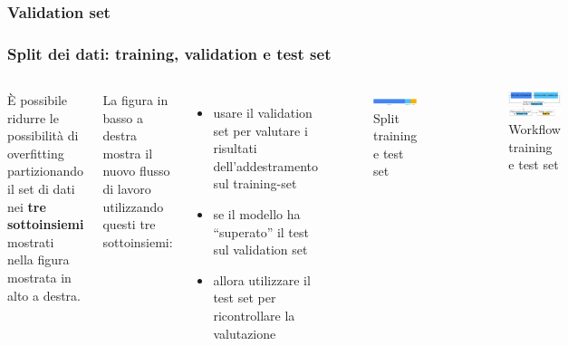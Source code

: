 \subsubsection[Validation set]{Validation set}


\begin{frame}

	\frametitle{Split dei dati: training, validation e test set}
	\begin{columns}
		È possibile ridurre le possibilità di overfitting partizionando il set di dati nei \textbf{tre sottoinsiemi} mostrati nella figura mostrata in alto a destra.
		\newlinedouble

		La figura in basso a destra mostra il nuovo flusso di lavoro utilizzando questi tre sottoinsiemi:
		\begin{itemize}
			\item usare il validation set per valutare i risultati dell'addestramento sul training-set
			\item se il modello ha ``superato'' il test sul validation set
			\item allora utilizzare il test set per ricontrollare la valutazione
		\end{itemize}


		\begin{figure}[!htbp]
			\centering
			\includegraphics[width=1.0\linewidth]{images/supervised/validation_test_splitting_data/Training_Test_Validation_1.pdf}
			\caption{Split training e test set}
		\end{figure}

		\begin{figure}[!htbp]
			\centering
			\includegraphics[width=1.0\linewidth]{images/supervised/validation_test_splitting_data/Training_Test_Validation_2.pdf}
			\caption{Workflow training e test set}
		\end{figure}
	\end{columns}
\end{frame}


